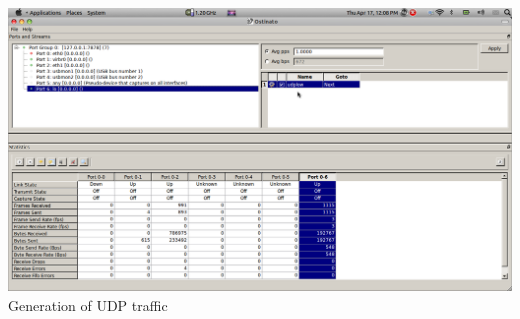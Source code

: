 \documentclass[a4paper,12pt,oneside]{article}
\begin{document}
\begin{center}
\includegraphics[width=13 cm,height=12 cm]{./udptraffic.png}
 Generation of UDP traffic
\end{center}
 \newpage
\end{document}
